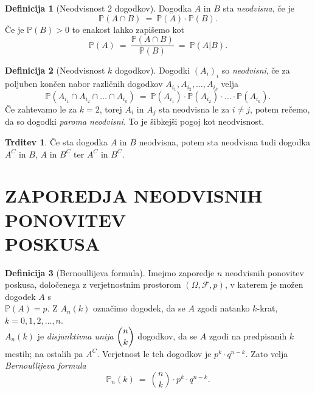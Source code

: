 \documentclass[11pt]{article}
\theoremstyle{definition}
\newtheorem{definicija}{Definicija}[section]
\theoremstyle{definition}
\newtheorem{trditev}{Trditev}[section]
\theoremstyle{definition}
\begin{document}
\begin{definicija}[Neodvisnost $2$ dogodkov]

Dogodka $A$ in $B$ sta \textit{neodvisna}, če je 
$$\mathbb{P}(A \cap B) ~=~ \mathbb{P}(A) \cdot \mathbb{P}(B).$$
Če je $\mathbb{P}(B) > 0$ to enakost lahko zapišemo kot
$$\mathbb{P}(A) ~=~ \frac{\mathbb{P}(A \cap B)}{\mathbb{P}(B)} ~=~ \mathbb{P}(A | B).$$

\end{definicija}
\vspace{0.5cm}

\begin{definicija}[Neodvisnost $k$ dogodkov]

Dogodki $(A_i)_i$ so \textit{neodvisni}, če za poljuben končen nabor različnih dogodkov $A_{i_1}, A_{i_2}, \ldots, A_{i_k}$ velja
$$\mathbb{P}(A_{i_1} \cap A_{i_2} \cap \ldots \cap A_{i_k}) ~=~ \mathbb{P}(A_{i_1}) \cdot \mathbb{P}(A_{i_2}) \cdot \ldots \cdot \mathbb{P}(A_{i_k}).$$
Če zahtevamo le za $k = 2$, torej $A_i$ in $A_j$ sta neodvisna le za $i \neq j$, potem rečemo, da so dogodki \textit{paroma neodvisni}. To je šibkejši pogoj kot neodvisnost.

\end{definicija}

\begin{trditev}

Če sta dogodka $A$ in $B$ neodvisna, potem sta neodvisna tudi dogodka $A^C$ in $B$, $A$ in $B^C$ ter $A^C$ in $B^C$.

\end{trditev}
\vspace{0.5cm}


\pagebreak


\section{ZAPOREDJA NEODVISNIH PONOVITEV \\POSKUSA}
\vspace{0.5cm}

\begin{definicija}[Bernoullijeva formula]

Imejmo zaporedje $n$ neodvisnih ponovitev poskusa, določenega z verjetnostnim prostorom $(\Omega, \mathcal{F}, p)$, v katerem je možen dogodek $A$ s \\$\mathbb{P}(A) = p$.
Z $A_n(k)$ označimo dogodek, da se $A$ zgodi natanko $k$-krat, $k = 0, 1, 2, \ldots, n$. \\

\noindent $A_n(k)$ je \textit{disjunktivna unija} $\mathlarger{\binom{n}{k}}$ dogodkov, da se $A$ zgodi na predpisanih $k$ mestih; na ostalih pa $A^C$. Verjetnost le teh dogodkov je $p^k \cdot q^{n-k}$. Zato velja \textit{Bernoullijeva formula}
$$\mathbb{P}_n(k) ~=~ \binom{n}{k} \cdot p^k \cdot q^{n-k}.$$

\end{definicija}
\vspace{0.5cm}
\end{document}
